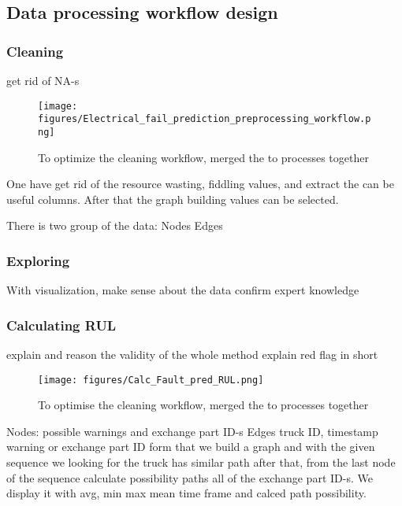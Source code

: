 	\subsection{Data processing workflow design}
\cite{BALNWSCBOOK}
\cite{CSDISTILLED}
\cite{DATACAMP}
\cite{LeanThinking}
		\subsubsection{Cleaning}
		get rid of NA-s
		\begin{figure}[!ht]
		\centering
		\texttt{[image: figures/Electrical\_fail\_prediction\_preprocessing\_workflow.png]}
		\caption{To optimize the cleaning workflow, merged the to processes together} 
		\end{figure}
		One have get rid of the resource wasting, fiddling values, and extract the can be useful columns. After that the graph building values can be selected.

		There is two group of the data:
		Nodes
		Edges

		\subsubsection{Exploring}
		With visualization, make sense about the data 
		confirm expert knowledge
		\subsubsection{Calculating RUL}
explain and reason the validity of the whole method
		explain red flag in short
		\begin{figure}[!ht]
		\centering
		\texttt{[image: figures/Calc\_Fault\_pred\_RUL.png]}
		\caption{To optimise the cleaning workflow, merged the to processes together} 
		\end{figure}
		Nodes: possible warnings and exchange part ID-s
		Edges truck ID, timestamp warning or exchange part ID
		form that we build a graph and with the given sequence we looking for the truck has similar path after that, from the last node of the sequence calculate possibility paths all of the exchange part ID-s. We display it with avg, min max mean time frame and calced path possibility.